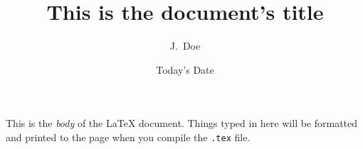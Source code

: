\documentclass{article} %
\title{This is the document's title}
\author{J.~Doe}
\date{Today's Date}
\begin{document}
	This is the \emph{body} of the \LaTeX{} document. Things typed in here will be formatted and printed to the page when you compile the \verb|.tex| file.
\end{document}

